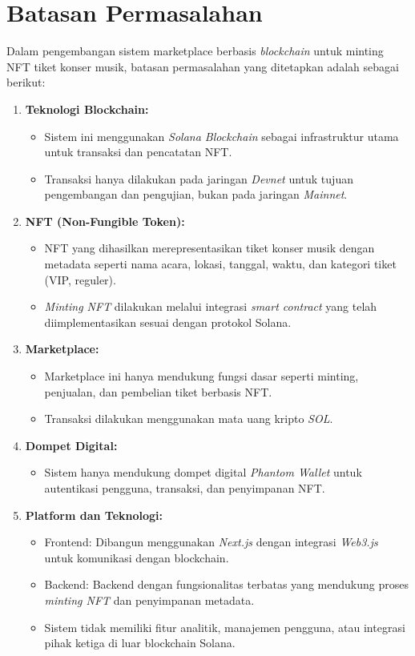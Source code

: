 \section{Batasan Permasalahan}

Dalam pengembangan sistem marketplace berbasis \textit{blockchain} untuk minting NFT tiket konser musik, batasan permasalahan yang ditetapkan adalah sebagai berikut:

\begin{enumerate}
    \item \textbf{Teknologi Blockchain:}
    \begin{itemize}
        \item Sistem ini menggunakan \textit{Solana Blockchain} sebagai infrastruktur utama untuk transaksi dan pencatatan NFT.
        \item Transaksi hanya dilakukan pada jaringan \textit{Devnet} untuk tujuan pengembangan dan pengujian, bukan pada jaringan \textit{Mainnet}.
    \end{itemize}

    \item \textbf{NFT (Non-Fungible Token):}
    \begin{itemize}
        \item NFT yang dihasilkan merepresentasikan tiket konser musik dengan metadata seperti nama acara, lokasi, tanggal, waktu, dan kategori tiket (VIP, reguler).
        \item \textit{Minting NFT} dilakukan melalui integrasi \textit{smart contract} yang telah diimplementasikan sesuai dengan protokol Solana.
    \end{itemize}

    \item \textbf{Marketplace:}
    \begin{itemize}
        \item Marketplace ini hanya mendukung fungsi dasar seperti minting, penjualan, dan pembelian tiket berbasis NFT.
        \item Transaksi dilakukan menggunakan mata uang kripto \textit{SOL}.
    \end{itemize}

    \item \textbf{Dompet Digital:}
    \begin{itemize}
        \item Sistem hanya mendukung dompet digital \textit{Phantom Wallet} untuk autentikasi pengguna, transaksi, dan penyimpanan NFT.
    \end{itemize}
    \item \textbf{Platform dan Teknologi:}
    \begin{itemize}
        \item {Frontend:} Dibangun menggunakan \textit{Next.js} dengan integrasi \textit{Web3.js} untuk komunikasi dengan blockchain.
        \item {Backend:} Backend dengan fungsionalitas terbatas yang mendukung proses \textit{minting NFT} dan penyimpanan metadata.
        \item Sistem tidak memiliki fitur analitik, manajemen pengguna, atau integrasi pihak ketiga di luar blockchain Solana.
    \end{itemize}


\end{enumerate}
